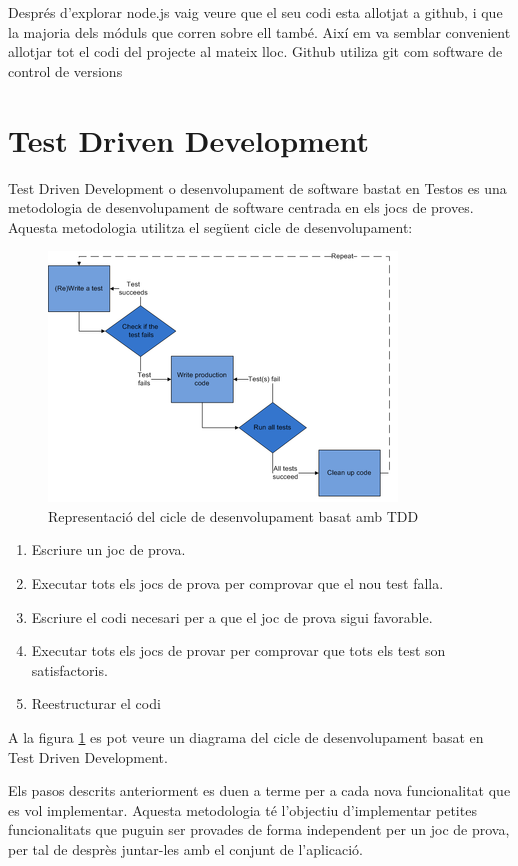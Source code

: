 Després d'explorar node.js vaig veure que el seu codi esta allotjat a github, i que la majoria dels móduls que corren sobre ell també. Així em va semblar convenient allotjar tot el codi del projecte al mateix lloc. Github utiliza git com software de control de versions

\section{Test Driven Development}

Test Driven Development o desenvolupament de software bastat en Testos es una metodologia de desenvolupament de software centrada en els jocs de proves. Aquesta metodologia utilitza el següent cicle de desenvolupament: 

\begin{figure}[htbp]
\centering\includegraphics{test-driven-development.png}
\caption{Representació del cicle de desenvolupament basat amb TDD}
\label{fig:tdd}
\end{figure} 

\begin{enumerate}
    \item{Escriure un joc de prova.}
    \item{Executar tots els jocs de prova per comprovar que el nou test falla.}
    \item{Escriure el codi necesari per a que el joc de prova sigui favorable.}
    \item{Executar tots els jocs de provar per comprovar que tots els test son satisfactoris.}
    \item{Reestructurar el codi}
\end{enumerate}

A la figura \ref{fig:tdd} es pot veure un diagrama del cicle de desenvolupament basat en Test Driven Development.

Els pasos descrits anteriorment es duen a terme per a cada nova funcionalitat que es vol implementar. Aquesta metodologia té l'objectiu d'implementar petites funcionalitats que puguin ser provades de forma independent per un joc de prova, per tal de desprès juntar-les amb el conjunt de l'aplicació. 

